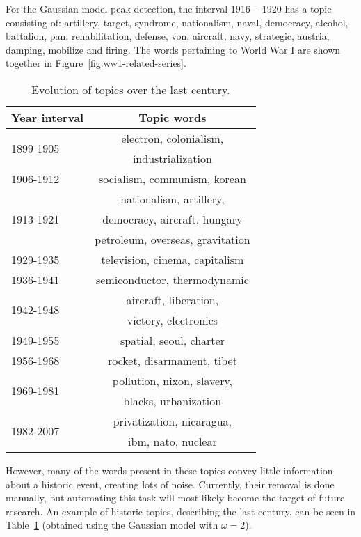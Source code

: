 For the Gaussian model peak detection, the interval $1916 - 1920$ has a topic consisting of: artillery, target, syndrome, nationalism, naval, democracy, alcohol, battalion, pan, rehabilitation, defense, von, aircraft, navy, strategic, austria, damping, mobilize and firing. The words pertaining to World War I are shown together in Figure~\ref{fig:ww1-related-series}.

\begin{table}[h]
\begin{center}
\begin{tabular}{|l|c|}
\hline \bf Year interval & \bf Topic words \\ \hline
\multirow{2}{*}{1899-1905} & electron, colonialism, \\
	& industrialization \\ \hline
1906-1912 & socialism, communism, korean \\ \hline
\multirow{3}{*}{1913-1921} & nationalism, artillery, \\
	& democracy, aircraft, hungary \\ \hline
1922-1928 & petroleum, overseas, gravitation \\ \hline
1929-1935 & television, cinema, capitalism \\ \hline
1936-1941 & semiconductor, thermodynamic \\ \hline
\multirow{2}{*}{1942-1948} & aircraft, liberation, \\
	& victory, electronics \\ \hline
1949-1955 & spatial, seoul, charter \\ \hline
1956-1968 & rocket, disarmament, tibet \\ \hline
\multirow{2}{*}{1969-1981} & pollution, nixon, slavery, \\
	& blacks, urbanization \\ \hline
\multirow{2}{*}{1982-2007} & privatization, nicaragua, \\
	& ibm, nato, nuclear \\
\hline
\end{tabular}
\end{center}
\caption{\label{tbl:topic-evolution} Evolution of topics over the last century. }
\end{table}

However, many of the words present in these topics convey little information about a historic event, creating lots of noise. Currently, their removal is done manually, but automating this task will most likely become the target of future research. An example of historic topics, describing the last century, can be seen in Table~\ref{tbl:topic-evolution} (obtained using the Gaussian model with $\omega = 2$).
